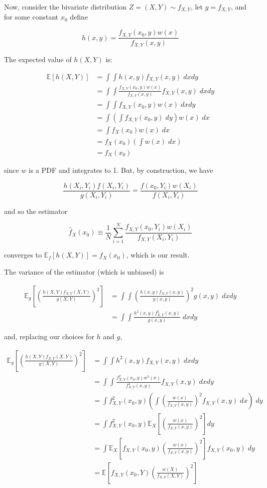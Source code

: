 Now, consider the bivariate distribution \(Z = (X, Y) \sim f_{X, Y}\),
let \(g = f_{X, Y}\), and for some constant \(x_{0}\) define

\[ h(x, y) = \frac{f_{X, Y}(x_{0}, y) w(x) }{ f_{X, Y}(x, y) } \]

The expected value of \(h(X, Y)\) is:

\begin{align*}
\mathbb{E}[h(X, Y)] &= \int \int h(x, y) f_{X, Y}(x, y) \; dx dy \\
&= \int \int \frac{f_{X, Y}(x_{0}, y) w(x)}{f_{X, Y}(x, y)} f_{X, Y}(x, y) \; dx dy \\
&= \int \int f_{X, Y}(x_{0}, y) w(x) \; dx dy \\
&= \int \left(\int f_{X, Y}(x_{0}, y) \; dy \right) w(x) \; dx \\
&= \int f_X(x_{0}) w(x) \; dx \\
&= f_X(x_{0}) \left( \int w(x) \; dx \right) \\
&= f_X(x_{0})
\end{align*}

since \(w\) is a PDF and integrates to 1. But, by construction, we have

\[ 
\frac{h(X_{i}, Y_{i}) f(X_{i}, Y_{i})}{g(X_{i}, Y_{i})}
=
\frac{f(x_{0}, Y_{i}) w(X_{i})}{f(X_{i}, Y_{i})}
\]

and so the estimator

\[ \hat{f}_X(x_{0}) \equiv \frac{1}{N} \sum_{i=1}^N \frac{f_{X, Y}(x_{0}, Y_{i})  w(X_{i})}{f_{X, Y}(X_{i}, Y_{i})} \]

converges to \(\mathbb{E}_f[h(X, Y)] = f_X(x_{0})\), which is our result.

The variance of the estimator (which is unbiased) is

\begin{align*}
\mathbb{E}_g\left[ \left(\frac{h(X, Y) f_{X, Y}(X, Y)}{g(X, Y)} \right)^{2} \right]
&= \int \int \left( \frac{h(x, y) f_{X, Y}(x, y)}{g(x, y)} \right)^{2} g(x, y) \; dx dy \\
&= \int \int \frac{h^{2}(x, y) f_{X, Y}^{2}(x, y)}{g(x, y)} \; dx dy
\end{align*}

and, replacing our choices for \(h\) and \(g\),

\begin{align*}
\mathbb{E}_g\left[ \left(\frac{h(X, Y) f_{X, Y}(X, Y)}{g(X, Y)} \right)^{2} \right]
&= \int \int h^{2}(x, y) f_{X, Y}(x, y) \; dx dy \\
&= \int \int \frac{f_{X, Y}^{2}(x_{0}, y) w^{2}(x) }{ f_{X, Y}^{2}(x, y) } f_{X, Y}(x, y) \; dx dy \\
&= \int f_{X, Y}^{2}(x_{0}, y) \left( \int \left(\frac{w(x)}{f_{X, Y}(x, y)}\right)^{2} f_{X, Y}(x, y) \; dx \right) \; dy \\
&= \int f_{X, Y}^{2}(x_{0}, y) \mathbb{E}_X\left[ \left(\frac{w(x)}{f_{X, Y}(x, y)}\right)^{2} \right] dy \\
&= \int \mathbb{E}_X\left[ f_{X, Y}(x_{0}, y) \left(\frac{w(x)}{f_{X, Y}(x, y)}\right)^{2} \right] f_{X, Y}(x_{0}, y) \; dy \\
&= \mathbb{E} \left[  f_{X, Y}(x_{0}, Y) \left(\frac{w(X)}{f_{X, Y}(X, Y)}\right)^{2} \right]
\end{align*}

